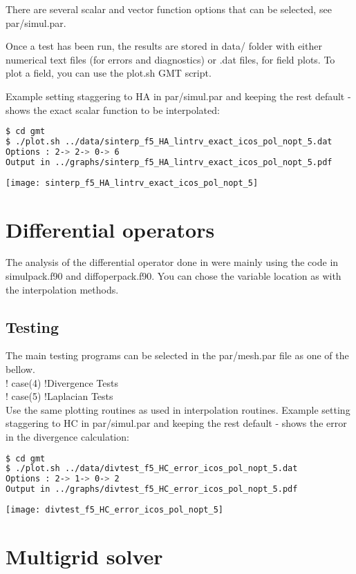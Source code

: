 \documentclass[a4paper,10pt]{article}
\begin{document}
There are several scalar and vector function options that can be selected, see par/simul.par.

Once a test has been run, the results are stored in data/ folder with either numerical text files (for errors and diagnostics) or .dat files, for field plots. To plot a field, you can use the plot.sh GMT script. 

Example setting staggering to HA in par/simul.par and keeping the rest default - shows the exact scalar function to be interpolated:
\begin{lstlisting}[language=bash]
$ cd gmt
$ ./plot.sh ../data/sinterp_f5_HA_lintrv_exact_icos_pol_nopt_5.dat 
Options : 2-> 2-> 0-> 6
Output in ../graphs/sinterp_f5_HA_lintrv_exact_icos_pol_nopt_5.pdf
\end{lstlisting}
\texttt{[image: sinterp\_f5\_HA\_lintrv\_exact\_icos\_pol\_nopt\_5]}


\section{Differential operators}

The analysis of the differential operator done in \cite{Peixoto2013} were mainly using the code in simulpack.f90 and diffoperpack.f90. You can chose the variable location as with the interpolation methods.

\subsection{Testing}
The main testing programs can be selected in the par/mesh.par file as one of the bellow.\\
!  case(4) !Divergence Tests\\
!  case(5) !Laplacian Tests\\

Use the same plotting routines as used in interpolation routines. Example setting staggering to HC in par/simul.par and keeping the rest default - shows the error in the divergence calculation:

\begin{lstlisting}[language=bash]
$ cd gmt
$ ./plot.sh ../data/divtest_f5_HC_error_icos_pol_nopt_5.dat
Options : 2-> 1-> 0-> 2
Output in ../graphs/divtest_f5_HC_error_icos_pol_nopt_5.pdf
\end{lstlisting}
\texttt{[image: divtest\_f5\_HC\_error\_icos\_pol\_nopt\_5]}

\section{Multigrid solver}
\end{document}
